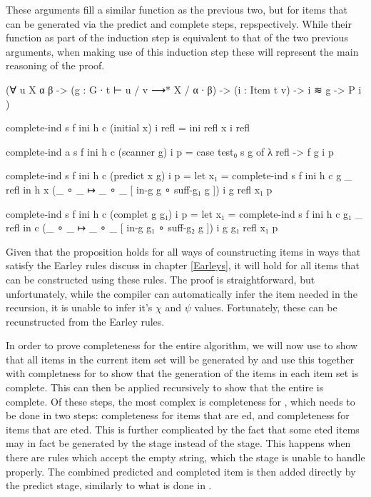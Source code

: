 		These arguments fill a similar function as the previous two, but for 
		items that can be generated via the predict and complete steps, 
		repspectively. While their function as part of the induction step is 
		equivalent to that of the two previous arguments, when making use of 
		this induction step these will represent the main reasoning of the 
		proof.
		
		\begin{code}
			  (∀ {u X α β} ->
			    (g : G ∙ t ⊢ u / v ⟶* X / α ∙ β) ->
			    (i : Item t v) ->
			    i ≋ g ->
			    P i
			  )

			complete-ind s f ini h c (initial x) i refl =
			  ini refl x i refl
			
			complete-ind {a} s f ini h c (scanner g) i p =
			  case test₀ s g of λ {refl -> f g i p}
			
			complete-ind s f ini h c (predict x g) i p =
			  let x₁ = complete-ind s f ini h c g _ refl in
			  h x (_ ∘ _ ↦ _ ∘ _ [ in-g g ∘ suff-g₁ g ]) i g refl x₁ p
			
			complete-ind s f ini h c (complet g g₁) i p =
			  let x₁ = complete-ind s f ini h c g₁ _ refl in
			  c (_ ∘ _ ↦ _ ∘ _ [ in-g g₁ ∘ suff-g₂ g ]) i g g₁ refl x₁ p
		\end{code}

		Given that the proposition holds for all ways of counstructing items in
		ways that satisfy the Earley rules discuss in chapter \ref{Earleys}, it
		will hold for all items that can be constructed using these rules. The
		proof is straightforward, but unfortunately, while the compiler can
		automatically infer the item needed in the recursion, it is unable to 
		infer it's $\chi$ and $\psi$ values. Fortunately, these can be 
		recunstructed from the Earley rules.
		
		In order to prove completeness for the entire algorithm, we will now
		use  to show that all items in the current item
		set will be generated by  and use this together with
		completness for  to show that the generation of the items
		in each item set is complete. This can then be applied recursively to
		show that the entire  is complete. Of these steps, the
		most complex is completeness for , which needs to be
		done in two steps: completeness for items that are ed,
		and completeness for items that are eted. This is further
		complicated by the fact that some eted items may in fact
		be generated by the  stage instead of the
		 stage. This happens when there are rules which accept
		the empty string, which the  stage is unable to handle
		properly. The combined predicted and completed item is then added
		directly by the predict stage, similarly to what is done in
		\cite{effEarley}.


